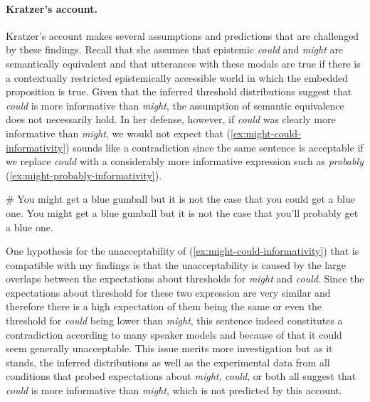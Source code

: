 \paragraph{Kratzer's account.} Kratzer's account makes several assumptions and predictions that are challenged by these findings. Recall that she assumes that epistemic \textit{could} and
\textit{might} are semantically equivalent and that utterances with these modals are true if there is a contextually restricted epistemically accessible
world in which the embedded proposition is true. Given that the inferred threshold distributions suggest that \textit{could} is more informative than \textit{might},
the assumption of semantic equivalence does not necessarily hold. In her defense, however, if \textit{could} was clearly more informative than \textit{might},
we would not expect that (\ref{ex:might-could-informativity}) sounds like a contradiction since the same sentence is acceptable if we replace \textit{could} with
a considerably more informative expression such as \textit{probably} (\ref{ex:might-probably-informativity}).


\begin{exe}
\ex \label{ex:might-could-informativity} \# You might get a blue gumball but it is not the case that you could get a blue one.
\ex \label{ex:might-probably-informativity} You might get a blue gumball but it is not the case that you'll probably get a blue one.
\end{exe}

\noindent One hypothesis for the unacceptability of (\ref{ex:might-could-informativity}) that is compatible with my findings is
that the unacceptability is caused by the large overlaps between the expectations about thresholds for \textit{might} and \textit{could}. 
Since the expectations about threshold for these two expression are very similar and therefore there is a 
high expectation of them being the same or even the threshold for \textit{could} being lower than \textit{might}, this sentence
indeed constitutes a contradiction according to many speaker models and  because of that it could seem generally unacceptable.
This issue merits more investigation but as it stands,  the inferred distributions as well as the experimental data from all conditions
that probed expectations about \textit{might}, \textit{could}, or both all suggest that \textit{could} is more informative than \textit{might}, which is not
predicted by this account.

